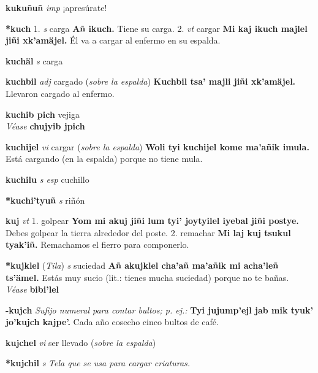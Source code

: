 \documentclass[10pt]{scrbook}
\newcommand{\entry}[1]{\textbf{#1}}
\newcommand{\onedefinition}[1]{#1.}
\newcommand{\nontranslationdef}[1]{\textit{#1}}
\newcommand{\partofspeech}[1]{\textit{#1}}
\newcommand{\spanishtranslation}[1]{#1}
\newcommand{\clarification}[1]{(\textit{#1})}
\newcommand{\cholexample}[1]{\textbf{#1}}
\newcommand{\exampletranslation}[1]{#1}
\newcommand{\alsosee}[1]{\\\textit{Véase} \textbf{#1}}
\newcommand{\relevantdialect}[1]{(\textit{#1})}
\begin{document}
\begin{multicols}{2}
\entry{kukuñuñ}
\partofspeech{imp}
\spanishtranslation{¡apresúrate!}

\entry{*kuch}
\onedefinition{1}
\partofspeech{s}
\spanishtranslation{carga}
\cholexample{Añ ikuch.}
\exampletranslation{Tiene su carga.}
\onedefinition{2}
\partofspeech{vt}
\spanishtranslation{cargar}
\cholexample{Mi kaj ikuch majlel jiñi xk'amäjel.}
\exampletranslation{Él va a cargar al enfermo en su espalda.}

\entry{kuchäl}
\partofspeech{s}
\spanishtranslation{carga}

\entry{kuchbil}
\partofspeech{adj}
\spanishtranslation{cargado}
\clarification{sobre la espalda}
\cholexample{Kuchbil tsa' majli jiñi xk'amäjel.}
\exampletranslation{Llevaron cargado al enfermo.}

\entry{kuchib pich}
\spanishtranslation{vejiga}
\alsosee{chujyib jpich}

\entry{kuchijel}
\partofspeech{vi}
\spanishtranslation{cargar}
\clarification{sobre la espalda}
\cholexample{Woli tyi kuchijel kome ma'añik imula.}
\exampletranslation{Está cargando (en la espalda) porque no tiene mula.}

\entry{kuchilu}
\partofspeech{s esp}
\spanishtranslation{cuchillo}

\entry{*kuchi'tyuñ}
\partofspeech{s}
\spanishtranslation{riñón}

\entry{kuj}
\partofspeech{vt}
\onedefinition{1}
\spanishtranslation{golpear}
\cholexample{Yom mi akuj jiñi lum tyi' joytyilel iyebal jiñi postye.}
\exampletranslation{Debes golpear la tierra alrededor del poste.}
\onedefinition{2}
\spanishtranslation{remachar}
\cholexample{Mi laj kuj tsukul tyak'iñ.}
\exampletranslation{Remachamos el fierro para componerlo.}

\entry{*kujklel}
\relevantdialect{Tila}
\partofspeech{s}
\spanishtranslation{suciedad}
\cholexample{Añ akujklel cha'añ ma'añik mi acha'leñ ts'ämel.}
\exampletranslation{Estás muy sucio (lit.: tienes mucha suciedad) porque no te bañas.}
\alsosee{bibi'lel}

\entry{-kujch}
\nontranslationdef{Sufijo numeral para contar bultos; p. ej.:}
\cholexample{Tyi jujump'ejl jab mik tyuk' jo'kujch kajpe'.}
\exampletranslation{Cada año cosecho cinco bultos de café.}

\entry{kujchel}
\partofspeech{vi}
\spanishtranslation{ser llevado}
\clarification{sobre la espalda}

\entry{*kujchil}
\partofspeech{s}
\nontranslationdef{Tela que se usa para cargar criaturas.}


\end{multicols}
\end{document}

